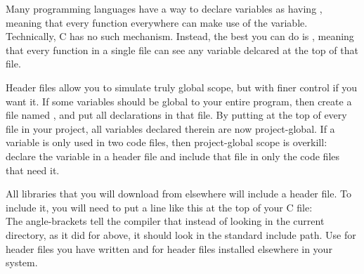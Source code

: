  \label{fileglobal}
Many programming languages have a way to declare variables as having
, meaning that every function everywhere can make use
of the variable. Technically, C has no such mechanism. Instead, the best
you can do is , meaning that every function in a
single file can see any variable delcared at the top of that file.

Header files allow you to simulate truly global scope, but with finer
control if you want it. If some variables should be global to your
entire program, then create a file named , and put all
declarations in that file. By putting  at
the top of every file in your project, all variables declared therein
are now project-global.  If a variable is only used in two code files,
then project-global scope is overkill: declare the variable in a header
file and include that file in only the code files that need it.

All libraries that you will download from elsewhere will include a header file.
To include it, you will need to put a line like this at the top of your C file:
\\
The angle-brackets tell the compiler that instead of looking in the
current directory, as it did for  above, it should
look in the standard include path. Use  for header
files you have written and  for header files
installed elsewhere in your system.  


